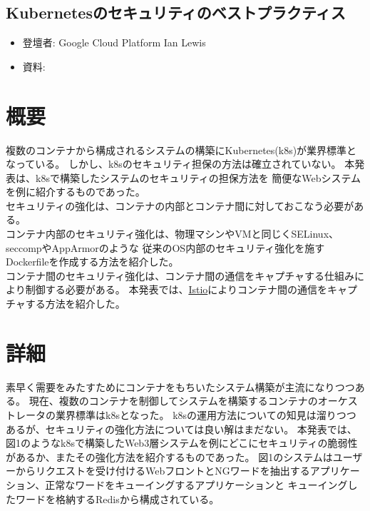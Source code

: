 \begin{center}
  \section*{Kubernetesのセキュリティのベストプラクティス}
\end{center}


\begin{flushright}
  \begin{itemize}
  \item   登壇者: Google Cloud Platform Ian Lewis
  \item 資料: 
  \end{itemize}
\end{flushright}

\section*{概要}

複数のコンテナから構成されるシステムの構築にKubernetes(k8s)が業界標準となっている。
しかし、k8sのセキュリティ担保の方法は確立されていない。
本発表は、k8sで構築したシステムのセキュリティの担保方法を
簡便なWebシステムを例に紹介するものであった。\\

セキュリティの強化は、コンテナの内部とコンテナ間に対しておこなう必要がある。\\

コンテナ内部のセキュリティ強化は、物理マシンやVMと同じくSELinux、seccompやAppArmorのような
従来のOS内部のセキュリティ強化を施すDockerfileを作成する方法を紹介した。\\

コンテナ間のセキュリティ強化は、コンテナ間の通信をキャプチャする仕組みにより制御する必要がある。
本発表では、\href{https://istio.io/}{Istio}によりコンテナ間の通信をキャプチャする方法を紹介した。

\section*{詳細}

素早く需要をみたすためにコンテナをもちいたシステム構築が主流になりつつある。
現在、複数のコンテナを制御してシステムを構築するコンテナのオーケストレータの業界標準はk8sとなった。
k8sの運用方法についての知見は溜りつつあるが、セキュリティの強化方法については良い解はまだない。
本発表では、図1のようなk8sで構築したWeb3層システムを例にどこにセキュリティの脆弱性があるか、またその強化方法を紹介するものであった。
図1のシステムはユーザーからリクエストを受け付けるWebフロントとNGワードを抽出するアプリケーション、正常なワードをキューイングするアプリケーションと
キューイングしたワードを格納するRedisから構成されている。\\

